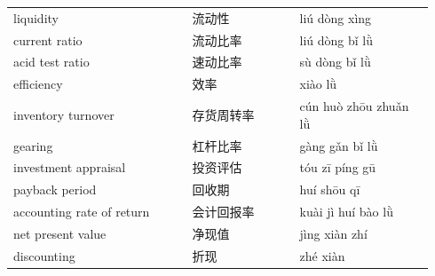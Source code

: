\documentclass[11pt]{article}
\begin{document}
\begin{longtable}{@{}p{0.40\linewidth}p{0.24\linewidth}p{0.30\linewidth}@{}}
liquidity & 流动性 & liú dòng xìng \\
current ratio & 流动比率 & liú dòng bǐ lǜ \\
acid test ratio & 速动比率 & sù dòng bǐ lǜ \\
efficiency & 效率 & xiào lǜ \\
inventory turnover & 存货周转率 & cún huò zhōu zhuǎn lǜ \\
gearing & 杠杆比率 & gàng gǎn bǐ lǜ \\
investment appraisal & 投资评估 & tóu zī píng gū \\
payback period & 回收期 & huí shōu qī \\
accounting rate of return & 会计回报率 & kuài jì huí bào lǜ \\
net present value & 净现值 & jìng xiàn zhí \\
discounting & 折现 & zhé xiàn \\
\end{longtable}
\end{document}

